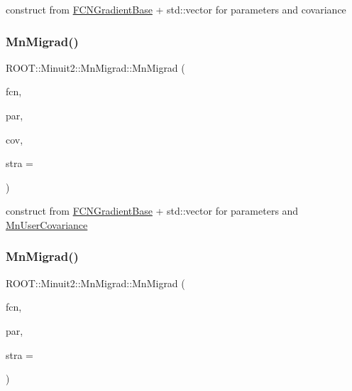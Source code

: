 construct from \mbox{\hyperlink{classROOT_1_1Minuit2_1_1FCNGradientBase}{F\+C\+N\+Gradient\+Base}} + std\+::vector for parameters and covariance 

\mbox{\label{classROOT_1_1Minuit2_1_1MnMigrad_ae34b6d666b4a960bd1b382d5e574fa69}} 
\subsubsection{\texorpdfstring{MnMigrad()}{MnMigrad()}\hspace{0.1cm}{\footnotesize\ttfamily [9/39]}}
{\footnotesize\ttfamily R\+O\+O\+T\+::\+Minuit2\+::\+Mn\+Migrad\+::\+Mn\+Migrad (\begin{DoxyParamCaption}\item[{const \mbox{\hyperlink{classROOT_1_1Minuit2_1_1FCNGradientBase}{F\+C\+N\+Gradient\+Base}} \&}]{fcn,  }\item[{const std\+::vector$<$ double $>$ \&}]{par,  }\item[{const \mbox{\hyperlink{classROOT_1_1Minuit2_1_1MnUserCovariance}{Mn\+User\+Covariance}} \&}]{cov,  }\item[{unsigned int}]{stra = {} }\end{DoxyParamCaption})\hspace{0.3cm}{\ttfamily [inline]}}



construct from \mbox{\hyperlink{classROOT_1_1Minuit2_1_1FCNGradientBase}{F\+C\+N\+Gradient\+Base}} + std\+::vector for parameters and \mbox{\hyperlink{classROOT_1_1Minuit2_1_1MnUserCovariance}{Mn\+User\+Covariance}} 

\mbox{\label{classROOT_1_1Minuit2_1_1MnMigrad_ac31c890a07d2e2ca4b52feb5ece6fa3d}} 
\subsubsection{\texorpdfstring{MnMigrad()}{MnMigrad()}\hspace{0.1cm}{\footnotesize\ttfamily [10/39]}}
{\footnotesize\ttfamily R\+O\+O\+T\+::\+Minuit2\+::\+Mn\+Migrad\+::\+Mn\+Migrad (\begin{DoxyParamCaption}\item[{const \mbox{\hyperlink{classROOT_1_1Minuit2_1_1FCNGradientBase}{F\+C\+N\+Gradient\+Base}} \&}]{fcn,  }\item[{const \mbox{\hyperlink{classROOT_1_1Minuit2_1_1MnUserParameters}{Mn\+User\+Parameters}} \&}]{par,  }\item[{unsigned int}]{stra = {} }\end{DoxyParamCaption})\hspace{0.3cm}{\ttfamily [inline]}}



